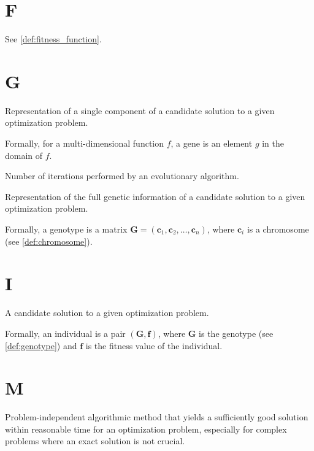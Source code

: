   \section*{F}
    \begin{definition}
      See \vref{def:fitness_function}.
    \end{definition}
    
  \section*{G}
    \begin{definition}[Gene]
    \label{def:gene}
      Representation of a single component of a candidate solution to a given optimization problem.

      Formally, for a multi-dimensional function \(f\), a gene is an element \(g\) in the domain of
      \(f\).
    \end{definition}

    \begin{definition}[Generation]
    \label{def:generation}
      Number of iterations performed by an evolutionary algorithm.
    \end{definition}

    \begin{definition}[Genotype]
    \label{def:genotype}
      Representation of the full genetic information of a candidate solution to a given optimization
      problem.

      Formally, a genotype is a matrix \(\mathbf{G} = (\textbf{c}_1, \textbf{c}_2, \dots, 
      \textbf{c}_n)\), where \(\textbf{c}_i\) is a chromosome (see \vref{def:chromosome}).
    \end{definition}

  \section*{I}
    \begin{definition}[Individual]
    \label{def:individual}
      A candidate solution to a given optimization problem.

      Formally, an individual is a pair \((\mathbf{G}, \mathbf{f})\), where \(\mathbf{G}\) is the
      genotype (see \vref{def:genotype}) and \(\mathbf{f}\) is the fitness value of the
      individual.
    \end{definition}

  \section*{M}
    \begin{definition}[Metaheuristics]
    \label{def:metaheuristic}
      Problem-independent algorithmic method that yields a sufficiently good solution within 
      reasonable time for an optimization problem, especially for complex problems where an exact 
      solution is not crucial.
    \end{definition}
  

